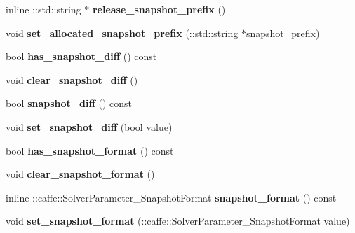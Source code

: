 \begin{DoxyCompactItemize}
inline \+::std\+::string $\ast$ {\bfseries release\+\_\+snapshot\+\_\+prefix} ()
\item 
\mbox{\label{classcaffe_1_1_solver_parameter_ae6d265b250b550f74d40cf728c329f05}} 
void {\bfseries set\+\_\+allocated\+\_\+snapshot\+\_\+prefix} (\+::std\+::string $\ast$snapshot\+\_\+prefix)
\item 
\mbox{\label{classcaffe_1_1_solver_parameter_a55204b8a8f5018e2b716d9c15e3eb099}} 
bool {\bfseries has\+\_\+snapshot\+\_\+diff} () const
\item 
\mbox{\label{classcaffe_1_1_solver_parameter_aa4978bfe5913c72f33dd68fb3e89ed20}} 
void {\bfseries clear\+\_\+snapshot\+\_\+diff} ()
\item 
\mbox{\label{classcaffe_1_1_solver_parameter_a226e5f9191d962477c17483875df574e}} 
bool {\bfseries snapshot\+\_\+diff} () const
\item 
\mbox{\label{classcaffe_1_1_solver_parameter_ab46e9ce3029d671fc7747caf60304833}} 
void {\bfseries set\+\_\+snapshot\+\_\+diff} (bool value)
\item 
\mbox{\label{classcaffe_1_1_solver_parameter_a5c4feaa6e2c39bc1fe9cd6fdbc0f800b}} 
bool {\bfseries has\+\_\+snapshot\+\_\+format} () const
\item 
\mbox{\label{classcaffe_1_1_solver_parameter_a986443cb679e9672ffae7b7c92e6bec6}} 
void {\bfseries clear\+\_\+snapshot\+\_\+format} ()
\item 
\mbox{\label{classcaffe_1_1_solver_parameter_ab6653e05ed32dd3360d41ef9cbe20860}} 
inline \+::caffe\+::\+Solver\+Parameter\+\_\+\+Snapshot\+Format {\bfseries snapshot\+\_\+format} () const
\item 
\mbox{\label{classcaffe_1_1_solver_parameter_a4e9100661612d6a24f5bc60db10a25ba}} 
void {\bfseries set\+\_\+snapshot\+\_\+format} (\+::caffe\+::\+Solver\+Parameter\+\_\+\+Snapshot\+Format value)
\item 

\end{DoxyCompactItemize}
